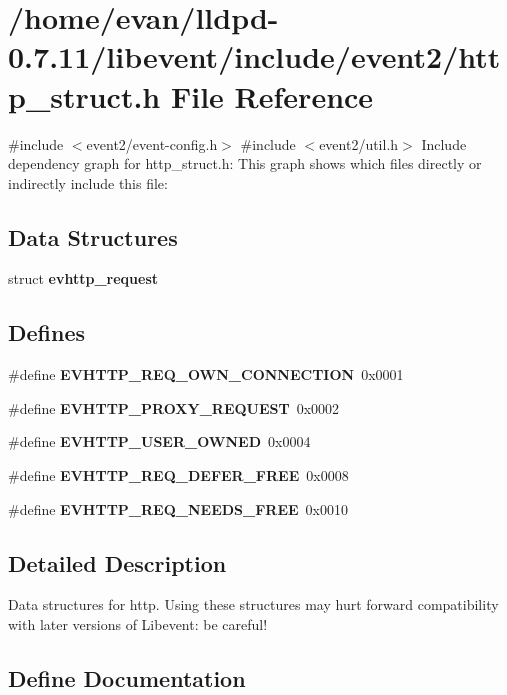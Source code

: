 \section{/home/evan/lldpd-\/0.7.11/libevent/include/event2/http\-\_\-struct.h \-File \-Reference}
\label{http__struct_8h}
{\ttfamily \#include $<$event2/event-\/config.\-h$>$}\*
{\ttfamily \#include $<$event2/util.\-h$>$}\*
\-Include dependency graph for http\-\_\-struct.\-h\-:
\-This graph shows which files directly or indirectly include this file\-:
\subsection*{\-Data \-Structures}
\begin{DoxyCompactItemize}
\item 
struct {\bf evhttp\-\_\-request}
\end{DoxyCompactItemize}
\subsection*{\-Defines}
\begin{DoxyCompactItemize}
\item 
\#define {\bf \-E\-V\-H\-T\-T\-P\-\_\-\-R\-E\-Q\-\_\-\-O\-W\-N\-\_\-\-C\-O\-N\-N\-E\-C\-T\-I\-O\-N}~0x0001
\item 
\#define {\bf \-E\-V\-H\-T\-T\-P\-\_\-\-P\-R\-O\-X\-Y\-\_\-\-R\-E\-Q\-U\-E\-S\-T}~0x0002
\item 
\#define {\bf \-E\-V\-H\-T\-T\-P\-\_\-\-U\-S\-E\-R\-\_\-\-O\-W\-N\-E\-D}~0x0004
\item 
\#define {\bf \-E\-V\-H\-T\-T\-P\-\_\-\-R\-E\-Q\-\_\-\-D\-E\-F\-E\-R\-\_\-\-F\-R\-E\-E}~0x0008
\item 
\#define {\bf \-E\-V\-H\-T\-T\-P\-\_\-\-R\-E\-Q\-\_\-\-N\-E\-E\-D\-S\-\_\-\-F\-R\-E\-E}~0x0010
\end{DoxyCompactItemize}


\subsection{\-Detailed \-Description}
\-Data structures for http. \-Using these structures may hurt forward compatibility with later versions of \-Libevent\-: be careful! 

\subsection{\-Define \-Documentation}
